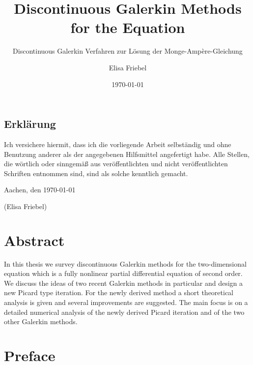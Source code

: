 \documentclass{template}
\title{Discontinuous Galerkin Methods for the \MA Equation}
\subtitle{\Large Discontinuous Galerkin Verfahren zur Lösung der Monge-Amp\`ere-Gleichung}
\author{Elisa Friebel} %
\date{\today}
\begin{document}
\maketitle

\begin{center}
\begin{minipage}[t]{0.8\textwidth}

\chapter*{Erklärung}
Ich versichere hiermit, dass ich die vorliegende Arbeit selbständig und
ohne Benutzung anderer als der angegebenen Hilfsmittel angefertigt habe.
Alle Stellen, die wörtlich oder sinngemäß aus veröffentlichten und nicht
veröffentlichten Schriften entnommen sind, sind als solche kenntlich
gemacht.

\vspace{1cm}
Aachen, den \today

\vspace{2cm}
(Elisa Friebel)
\end{minipage}
\end{center}
\thispagestyle{empty}
\cleardoublepage

\tableofcontents{}

\cleardoublepage
\setcounter{page}{1}


\chapter*{Abstract}
In this thesis we survey discontinuous Galerkin methods for the two-dimensional \MA equation which is a fully nonlinear partial differential equation of second order. We discuss the ideas of two recent Galerkin methods in particular and design a new Picard type iteration. For the newly derived method a short theoretical analysis is given and several improvements are suggested. The main focus is on a detailed numerical analysis of the newly derived Picard iteration and of the two other Galerkin methods.

\chapter*{Preface}
\label{ch:preface}

\end{document}
